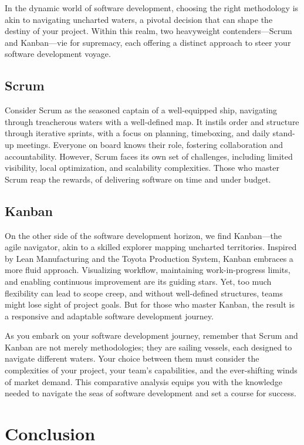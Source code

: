 \documentclass[conference]{IEEEtran}
\begin{document}
In the dynamic world of software development, choosing the right methodology is akin to navigating uncharted waters, a pivotal decision that can shape the destiny of your project. Within this realm, two heavyweight contenders—Scrum and Kanban—vie for supremacy, each offering a distinct approach to steer your software development voyage.

\subsection{Scrum}
Consider Scrum as the seasoned captain of a well-equipped ship, navigating through treacherous waters with a well-defined map. It instils order and structure through iterative sprints, with a focus on planning, timeboxing, and daily stand-up meetings. Everyone on board knows their role, fostering collaboration and accountability. However, Scrum faces its own set of challenges, including limited visibility, local optimization, and scalability complexities. Those who master Scrum reap the rewards, of delivering software on time and under budget.

\subsection{Kanban}
On the other side of the software development horizon, we find Kanban—the agile navigator, akin to a skilled explorer mapping uncharted territories. Inspired by Lean Manufacturing and the Toyota Production System, Kanban embraces a more fluid approach. Visualizing workflow, maintaining work-in-progress limits, and enabling continuous improvement are its guiding stars. Yet, too much flexibility can lead to scope creep, and without well-defined structures, teams might lose sight of project goals. But for those who master Kanban, the result is a responsive and adaptable software development journey.

As you embark on your software development journey, remember that Scrum and Kanban are not merely methodologies; they are sailing vessels, each designed to navigate different waters. Your choice between them must consider the complexities of your project, your team's capabilities, and the ever-shifting winds of market demand. This comparative analysis equips you with the knowledge needed to navigate the seas of software development and set a course for success.

\section{Conclusion}
\end{document}
